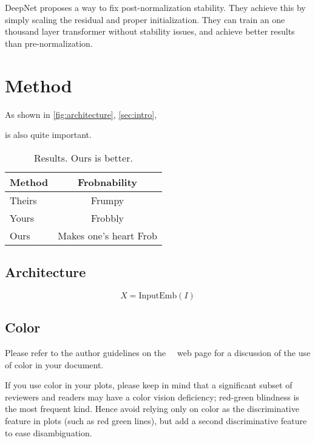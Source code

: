 \cite{wang2022deepnet} DeepNet proposes a way to fix post-normalization stability. They achieve this by simply scaling the residual and proper initialization. They can train an one thousand layer transformer without stability issues, and achieve better results than pre-normalization.

\section{Method}
\label{sec:method}

As shown in \cref{fig:architecture}, \cref{sec:intro},

 is also quite important.

\begin{table}
  \centering
  \begin{tabular}{@{}lc@{}}
    \toprule
    Method & Frobnability \\
    \midrule
    Theirs & Frumpy \\
    Yours & Frobbly \\
    Ours & Makes one's heart Frob\\
    \bottomrule
  \end{tabular}
  \caption{Results.   Ours is better.}
  \label{tab:example}
\end{table}

\subsection{Architecture}

\begin{equation}
  X = \text{InputEmb} (I)
  \label{eq:input_emb}
\end{equation}


\subsection{Color}

Please refer to the author guidelines on the \confName\ \confYear\ web page for a discussion of the use of color in your document.

If you use color in your plots, please keep in mind that a significant subset of reviewers and readers may have a color vision deficiency; red-green blindness is the most frequent kind.
Hence avoid relying only on color as the discriminative feature in plots (such as red \vs green lines), but add a second discriminative feature to ease disambiguation.